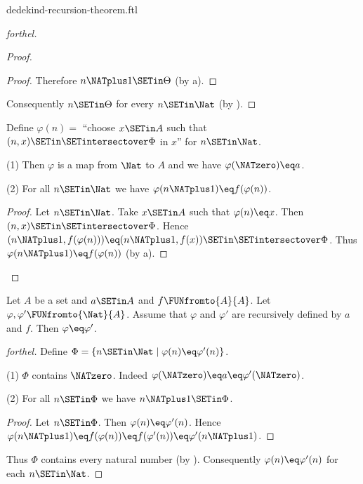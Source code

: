 \documentclass{naproche-library}
\begin{document}
\begin{smodule}[title=Dedekind's Recursion Theorem]{dedekind-recursion-theorem.ftl}
\begin{proof}[forthel]
\begin{proof}
\begin{proof}
      Therefore $n \NATplus 1 \SETin \Theta$ (by a).
    \end{proof}

    Consequently $n \SETin \Theta$ for every $n \SETin \Nat$ (by ).
  \end{proof}

  Define $\varphi(n) =$ ``choose $x \SETin A$ such that $(n, x) \SETin
  \SETintersectover \Phi$ in $x$'' for $n \SETin \Nat$.

  (1) Then $\varphi$ is a map from $\Nat$ to $A$ and we have
  $\varphi(\NATzero) \eq a$.

  (2) For all $n \SETin \Nat$ we have $\varphi(n \NATplus 1) \eq
  f(\varphi(n))$.
  \begin{proof}
    Let $n \SETin \Nat$.
    Take $x \SETin A$ such that $\varphi(n) \eq x$.
    Then $(n, x) \SETin \SETintersectover \Phi$.
    Hence $(n \NATplus 1, f(\varphi(n))) \eq (n \NATplus 1, f(x)) \SETin \SETintersectover \Phi$.
    Thus $\varphi(n \NATplus 1) \eq f(\varphi(n))$ (by a).
  \end{proof}
\end{proof}

\begin{theorem}[forthel,title=Dedekind's Recursion Theorem: Uniqueness,id=dedekind_uniqueness]
  Let $A$ be a set and $a \SETin A$ and $f \FUNfromto{A}{A}$.
  Let $\varphi, \varphi' \FUNfromto{\Nat}{A}$.
  Assume that $\varphi$ and $\varphi'$ are recursively defined by $a$ and
  $f$.
  Then $\varphi \eq \varphi'$.
\end{theorem}
\begin{proof}[forthel]
  Define $\Phi = \{ n \SETin \Nat \mid \varphi(n) \eq \varphi'(n) \}$.

  (1) $\Phi$ contains $\NATzero$.
  Indeed $\varphi(\NATzero) \eq a \eq \varphi'(\NATzero)$.

  (2) For all $n \SETin \Phi$ we have $n \NATplus 1 \SETin \Phi$.
  \begin{proof}
    Let $n \SETin \Phi$.
    Then $\varphi(n) \eq \varphi'(n)$.
    Hence $\varphi(n \NATplus 1)
      \eq f(\varphi(n))
      \eq f(\varphi'(n))
      \eq \varphi'(n \NATplus 1)$.
    \end{proof}

  Thus $\Phi$ contains every natural number (by ).
  Consequently $\varphi(n) \eq \varphi'(n)$ for each $n \SETin \Nat$.
\end{proof}
\end{smodule}
\end{document}
